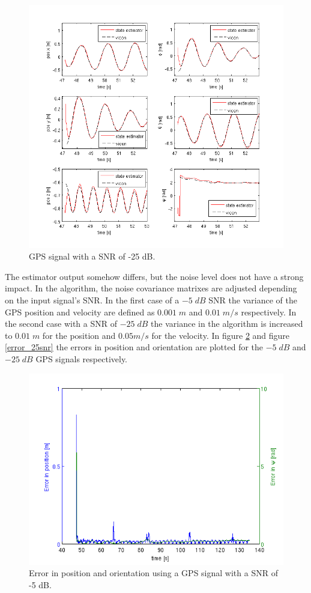 \begin{figure}[hb]
\centering
\includegraphics[width=1\textwidth]{pictures/2_2_SNR25_detail_GPS.png}
\caption{GPS signal with a SNR of -25 dB.}
\label{detail_25snr}
\end{figure}
The estimator output somehow differs, but the noise level does not have a strong impact. In the algorithm, the noise covariance matrixes are adjusted depending on the input signal's SNR. In the first case of a $-5\; dB$ SNR the variance of the GPS position and velocity are defined as $0.001\;m$ and $0.01\;m/s$ respectively. In the second case with a SNR of $-25\; dB$ the variance in the algorithm is increased to $0.01\;m$ for the position and $0.05 m/s$ for the velocity.
In figure \ref{error_5snr} and figure \ref{error_25snr} the errors in position and orientation are plotted for the $-5\; dB$ and $-25\; dB$ GPS signals respectively. 
\begin{figure}[hb]
\centering
\includegraphics[width=1\textwidth]{pictures/2_2_SNR5_errors_GPS.png}
\caption{Error in position and orientation using a GPS signal with a SNR of -5 dB.}
\label{error_5snr}
\end{figure}
